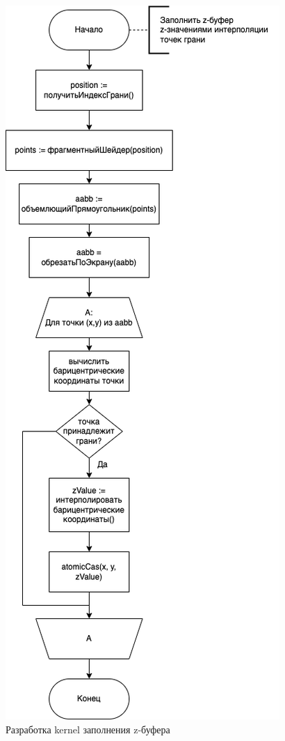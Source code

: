 \begin{figure}[ph!]
	\centering
	\includegraphics[height=0.95\textheight]{inc/img/diagrams-zfiller.drawio.png}
	\caption{Разработка kernel заполнения z-буфера}
	\label{fig:zfiller_kernel}
\end{figure}


